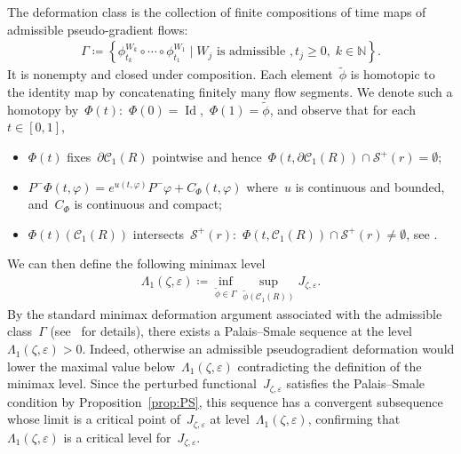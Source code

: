 \documentclass[10pt,a4paper]{amsart}
\newcommand{\p}{\partial}
\newcommand{\eps}{\varepsilon}
\newcommand{\braces}[1]{\left\{#1\right\}} %
\DeclareMathOperator{\id}{Id}
\begin{document}
The deformation class is the collection of finite compositions of time maps of admissible pseudo-gradient flows:
\begin{align}
    \Gamma\coloneqq \braces{ \phi^{W_k}_{t_k}\circ \cdots\circ \phi^{W_1}_{t_1} \mid W_j \mbox{ is admissible }, t_j\geq 0, \; k\in\mathbb{N} }. 
\end{align}
It is nonempty and closed under composition. 
Each element~$\tilde{\phi}$ is homotopic to the identity map by concatenating finitely many flow segments. 
We denote such a homotopy by~$\Phi(t)$:~$\Phi(0)=\id$,~$\Phi(1)=\tilde{\phi}$, and observe that for each~$t\in [0,1]$,
\begin{itemize}
    \item[(1)] $\Phi(t)$ fixes~$\p\mathscr{C}_1(R)$ pointwise and hence~$\Phi(t,\p\mathscr{C}_1(R))\cap \mathscr{S}^+(r) =\emptyset$;
    \item[(2)] $P^-\Phi(t,\varphi)=e^{u(t,\varphi)}P^-\varphi+ C_\Phi(t,\varphi)$ where~$u$ is continuous and bounded, and~$C_\Phi$ is continuous and compact;
    \item[(3)] $\Phi(t)(\mathscr{C}_1(R))$ intersects~$\mathscr{S}^+(r)$:~$\Phi(t,\mathscr{C}_1(R))\cap \mathscr{S}^+(r)\neq \emptyset$, see \cite[Lemma 4.6]{WZ2026Stationary}.
\end{itemize}


We can then define the following minimax level 
\begin{align}
    \Lambda_1(\zeta,\eps) \coloneqq \inf_{\tilde{\phi}\in \Gamma} \sup_{\tilde{\phi}(\mathscr{C}_1(R))} J_{\zeta,\eps}. 
\end{align}
By the standard minimax deformation argument associated with the admissible class~$\Gamma$ (see~\cite{WZ2026Stationary} for details), there exists a Palais--Smale sequence at the level~$\Lambda_1(\zeta,\eps)>0$. 
Indeed, otherwise an admissible pseudogradient deformation would lower the maximal value below~$\Lambda_1(\zeta,\eps)$ contradicting the definition of the minimax level. 
Since the perturbed functional~$J_{\zeta,\eps}$ satisfies the Palais--Smale condition by Proposition~\ref{prop:PS}, this sequence has a convergent subsequence whose limit is a critical point of~$J_{\zeta,\eps}$ at level~$\Lambda_1(\zeta,\eps)$, confirming that~$\Lambda_1(\zeta,\eps)$ is a critical level for~$J_{\zeta,\eps}$. 
\end{document}
